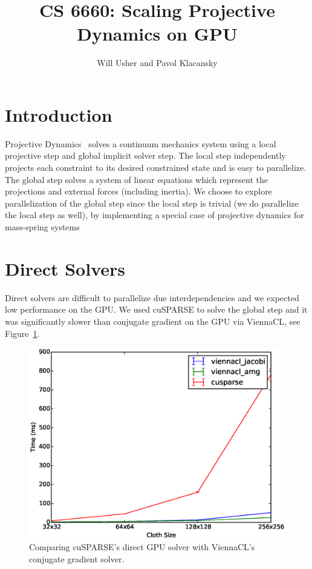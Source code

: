 \documentclass{article}
\title{CS 6660: Scaling Projective Dynamics on GPU}
\author{Will Usher and Pavol Klacansky}
\begin{document}
\maketitle

\section{Introduction}
Projective Dynamics~\cite{Bouaziz14} solves a continuum mechanics system using
a local projective step and global implicit solver step. The local step independently
projects each constraint to its desired constrained state and is easy to parallelize.
The global step solves a system of linear equations which represent
the projections and external forces (including inertia). We choose to explore
parallelization of the global step since the local step is trivial (we do
parallelize the local step as well), by implementing
a special case of projective dynamics for mass-spring systems~\cite{Liu13}

\section{Direct Solvers}
Direct solvers are difficult to parallelize due interdependencies and we
expected low performance on the GPU. We used cuSPARSE to solve the global step and it
was significantly slower than conjugate gradient on the GPU via ViennaCL,
see Figure~\ref{fig:cusparse_vs_cg}.

\begin{figure}[htb!]
	\centering
	\includegraphics[width=0.9\linewidth]{img/cusparse_vs_cg}
	\caption{Comparing cuSPARSE's direct GPU solver with ViennaCL's conjugate gradient
		solver. \label{fig:cusparse_vs_cg}}
\end{figure}
\end{document}

